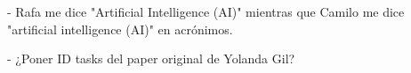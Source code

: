 - Rafa me dice "Artificial Intelligence (AI)" mientras que Camilo me dice "artificial intelligence (AI)" en acrónimos.



- ¿Poner ID tasks del paper original de Yolanda Gil?